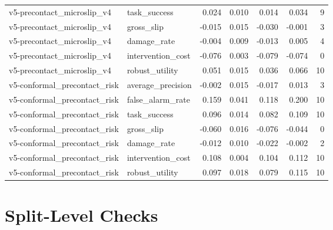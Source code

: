 \documentclass{article}
\begin{document}
\begin{longtable}{@{}llrrrrr@{}}
v5-precontact\_microslip\_v4 & task\_success & 0.024 & 0.010 & 0.014 & 0.034 & 9 \\
v5-precontact\_microslip\_v4 & gross\_slip & -0.015 & 0.015 & -0.030 & -0.001 & 3 \\
v5-precontact\_microslip\_v4 & damage\_rate & -0.004 & 0.009 & -0.013 & 0.005 & 4 \\
v5-precontact\_microslip\_v4 & intervention\_cost & -0.076 & 0.003 & -0.079 & -0.074 & 0 \\
v5-precontact\_microslip\_v4 & robust\_utility & 0.051 & 0.015 & 0.036 & 0.066 & 10 \\
v5-conformal\_precontact\_risk & average\_precision & -0.002 & 0.015 & -0.017 & 0.013 & 3 \\
v5-conformal\_precontact\_risk & false\_alarm\_rate & 0.159 & 0.041 & 0.118 & 0.200 & 10 \\
v5-conformal\_precontact\_risk & task\_success & 0.096 & 0.014 & 0.082 & 0.109 & 10 \\
v5-conformal\_precontact\_risk & gross\_slip & -0.060 & 0.016 & -0.076 & -0.044 & 0 \\
v5-conformal\_precontact\_risk & damage\_rate & -0.012 & 0.010 & -0.022 & -0.002 & 2 \\
v5-conformal\_precontact\_risk & intervention\_cost & 0.108 & 0.004 & 0.104 & 0.112 & 10 \\
v5-conformal\_precontact\_risk & robust\_utility & 0.097 & 0.018 & 0.079 & 0.115 & 10 \\
\bottomrule
\end{longtable}


\section{Split-Level Checks}
\end{document}
